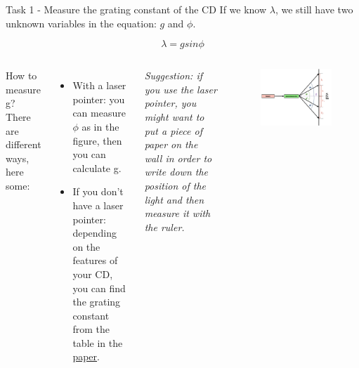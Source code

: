 \documentclass[9pt, xcolor=dvipsnames]{beamer}
\begin{document}
\begin{frame}{Task 1 - Measure the grating constant of the CD}	
If we know $\lambda$, we still have two unknown variables in the equation: $g$ and $\phi$.
	
	\begin{equation*}
		 \lambda = g sin \phi
	\end{equation*}
	\begin{columns}
	
	How to measure g? There are different ways, here some:
	\begin{itemize}
		\item With a laser pointer: you can measure $\phi$ as in the figure, then you can calculate g.		
		\item If you don't have a laser pointer: depending on the features of your CD, you can find the grating constant from the table in the \textcolor{blue}{\href{https://ieeexplore.ieee.org/stamp/stamp.jsp?tp=\&arnumber=5547333\&tag=1}{paper}}.
	\end{itemize}
	\textit{Suggestion: if you use the laser pointer, you might want to put a piece of paper on the wall in order to write down the position of the light and then measure it with the ruler.}
		
		\begin{figure}
		\begin{centering}
			\centering
			\includegraphics[width=1 \textwidth]{Figures/laser.png}
		\end{centering}
		\end{figure}
\end{columns}
\end{frame}
\end{document}
